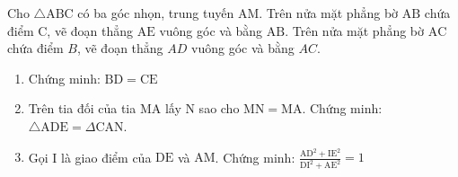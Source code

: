 \begin{bt}
    Cho $\triangle \mathrm{ABC}$ có ba góc nhọn, trung tuyến $\mathrm{AM}$. Trên nửa mặt phẳng bờ $\mathrm{AB}$ chứa điểm $\mathrm{C}$, vẽ đoạn thẳng $\mathrm{AE}$ vuông góc và bằng $\mathrm{AB}$. Trên nửa mặt phẳng bờ $\mathrm{AC}$ chứa điểm $B$, vẽ đoạn thẳng $A D$ vuông góc và bằng $A C$.

\begin{enumerate}
    \item Chứng minh: $\mathrm{BD}=\mathrm{CE}$
    \item Trên tia đối của tia MA lấy $\mathrm{N}$ sao cho $\mathrm{MN}=\mathrm{MA}$. Chứng minh: $\triangle \mathrm{ADE}=\Delta \mathrm{CAN}$.
    \item Gọi I là giao điểm của $\mathrm{DE}$ và $\mathrm{AM}$. Chứng minh: $\frac{\mathrm{AD}^2+\mathrm{IE}^2}{\mathrm{DI}^2+\mathrm{AE}^2}=1$
\end{enumerate}
\loigiai{}
\end{bt}